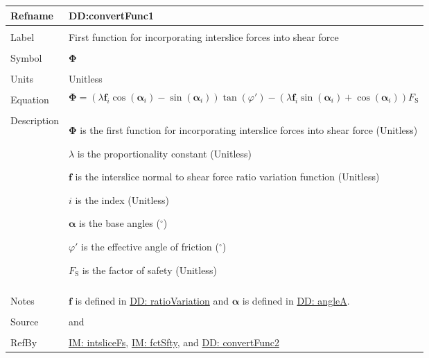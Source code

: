 \documentclass[12pt]{article}
\begin{document}
\noindent \begin{minipage}{\textwidth}
\begin{tabular}{>{\raggedright}p{}>{\raggedright\arraybackslash}p{}}
\toprule \textbf{Refname} & \textbf{DD:convertFunc1}
\label{DD:convertFunc1}
\\ \midrule \\
Label & First function for incorporating interslice forces into shear force
\\ \midrule \\
Symbol & $\mathbf{Φ}$
\\ \midrule \\
Units & Unitless
\\ \midrule \\
Equation & \begin{displaymath}
           \mathbf{Φ}=\left(λ {\mathbf{f}}_{i} \cos\left({\mathbf{α}}_{i}\right)-\sin\left({\mathbf{α}}_{i}\right)\right) \tan\left(φ'\right)-\left(λ {\mathbf{f}}_{i} \sin\left({\mathbf{α}}_{i}\right)+\cos\left({\mathbf{α}}_{i}\right)\right) {F_{\text{S}}}
           \end{displaymath}
\\ \midrule \\
Description & \begin{symbDescription}
              \item{$\mathbf{Φ}$ is the first function for incorporating interslice forces into shear force (Unitless)}
              \item{$λ$ is the proportionality constant (Unitless)}
              \item{$\mathbf{f}$ is the interslice normal to shear force ratio variation function (Unitless)}
              \item{$i$ is the index (Unitless)}
              \item{$\mathbf{α}$ is the base angles (${}^{\circ}$)}
              \item{$φ'$ is the effective angle of friction (${}^{\circ}$)}
              \item{${F_{\text{S}}}$ is the factor of safety (Unitless)}
              \end{symbDescription}
\\ \midrule \\
Notes & $\mathbf{f}$ is defined in \hyperref[DD:ratioVariation]{DD: ratioVariation} and $\mathbf{α}$ is defined in \hyperref[DD:angleA]{DD: angleA}.
\\ \midrule \\
Source & \cite{chen2005} and \cite{karchewski2012}
\\ \midrule \\
RefBy & \hyperref[IM:intsliceFs]{IM: intsliceFs}, \hyperref[IM:fctSfty]{IM: fctSfty}, and \hyperref[DD:convertFunc2]{DD: convertFunc2}
\\ \bottomrule
\end{tabular}
\end{minipage}
\par~
\end{document}
